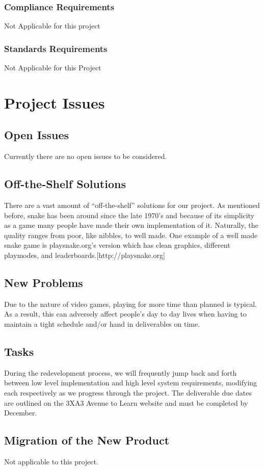 \documentclass[12pt]{article}
\begin{document}
\subsubsection*{Compliance Requirements}
Not Applicable for this project
\subsubsection*{Standards Requirements}
Not Applicable for this Project

\section{Project Issues}

\subsection{Open Issues}
	Currently there are no open issues to be considered.
\subsection{Off-the-Shelf Solutions}
	There are a vast amount of “off-the-shelf” solutions for our project. As mentioned before, snake has been around since the late 1970’s and because of its simplicity as a game many people have made their own implementation of it. Naturally, the quality ranges from poor, like nibbles, to well made. One example of a well made snake game is playsnake.org’s version which has clean graphics, different playmodes, and leaderboards.[http://playsnake.org]
\subsection{New Problems}
	Due to the nature of video games, playing for more time than planned is typical. As a result, this can adversely affect people's day to day lives when having to maintain a tight schedule and/or hand in deliverables on time. 
\subsection{Tasks}
	During the redevelopment process, we will frequently jump back and forth between low level implementation and high level system requirements, modifying each respectively as we progress through the project. The deliverable due dates are outlined on the 3XA3 Avenue to Learn website and must be completed by December.
\subsection{Migration of the New Product}
	Not applicable to this project.
\end{document}
